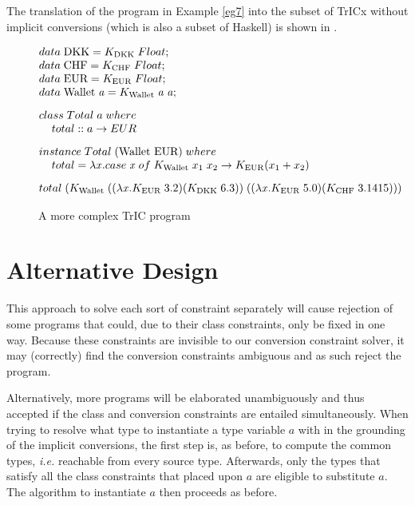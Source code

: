 The translation of the program in Example \ref{eg7} into the subset of TrICx without implicit conversions (which is also a subset of Haskell) is shown in .
\begin{figure}
     \[
\begin{array}{@{\hspace{0mm}}l@{\hspace{0mm}}}

  data\;\text{DKK}=K_{\text{DKK}}\; Float;\\
  data\;\text{CHF}=K_{\text{CHF}}\; Float;\\
  data\;\text{EUR}=K_{\text{EUR}}\; Float;\\
  data\;\text{Wallet}\;\tyVar=K_{\text{Wallet}}\; \tyVar \; \tyVar;\\[3mm]
  class\;Total\;a\;where\\\phantom{xx}total :: a \to EUR \\[3mm]
  instance\;Total\;(\text{Wallet EUR})\;where\\\phantom{xx} total=\lambda \tmVar. case\;\tmVar\; of\;K_{\text{Wallet}}\;x_1\;x_2 \to K_{\text{EUR}} (x_1+x_2)\\[3mm]
  
  total\; (K_{\text{Wallet}}\;((\lambda \tmVar . K_{\text{EUR}}\;3.2)(K_{\text{DKK}}\;6.3))\; ((\lambda \tmVar . K_{\text{EUR}}\;5.0)(K_{\text{CHF}}\;3.1415)))
  
\end{array}
\]
\caption{A more complex TrIC program}
\label{hm7}
\end{figure}

\section{Alternative Design}
\label{7.7}

This approach to solve each sort of constraint separately will cause rejection of some programs that could, due to their class constraints, only be fixed in one way. Because these constraints are invisible to our conversion constraint solver, it may (correctly) find the conversion constraints ambiguous and as such reject the program.

Alternatively, more programs will be elaborated unambiguously and thus accepted if the class and conversion constraints are entailed simultaneously. When trying to resolve what type to instantiate a type variable $a$ with in the grounding of the implicit conversions, the first step is, as before, to compute the common types, \textit{i.e.} reachable from every source type. Afterwards, only the types that satisfy all the class constraints that placed upon $a$ are eligible to substitute $a$. The algorithm to instantiate $a$ then proceeds as before.

